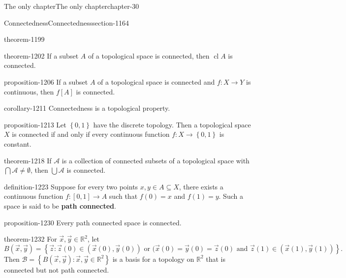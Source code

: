 \documentclass[oneside,10pt,]{book}
\newcommand{\terminology}[1]{\textbf{#1}}
\newcommand{\mb}{\mathbb}
\newcommand{\mc}{\mathcal}
\newcommand{\cl}{\operatorname{cl}}
\newcommand{\setBuilder}[2]{\left\{#1:#2\right\}}
\newcommand{\setList}[1]{\left\{#1\right\}}
\begin{document}
\begin{chapterptx}{The only chapter}{}{The only chapter}{}{}{chapter-30}
\begin{sectionptx}{Connectedness}{}{Connectedness}{}{}{section-1164}
\begin{theorem}{}{}{theorem-1199}
\end{theorem}
\begin{theorem}{}{}{theorem-1202}%
\hypertarget{p-1203}{}%
If a subset \(A\) of a topological space is connected, then \(\cl A\) is connected.%
\end{theorem}
\begin{proposition}{}{}{proposition-1206}%
\hypertarget{p-1207}{}%
If a subset \(A\) of a topological space is connected and \(f:X\to Y\) is continuous, then \(f[A]\) is connected.%
\end{proposition}
\begin{corollary}{}{}{corollary-1211}%
\hypertarget{p-1212}{}%
Connectedness is a topological property.%
\end{corollary}
\begin{proposition}{}{}{proposition-1213}%
\hypertarget{p-1214}{}%
Let \(\setList{0,1}\) have the discrete topology. Then a topological space \(X\) is connected if and only if every continuous function \(f:X\to\setList{0,1}\) is constant.%
\end{proposition}
\begin{theorem}{}{}{theorem-1218}%
\hypertarget{p-1219}{}%
If \(\mc A\) is a collection of connected subsets of a topological space with \(\bigcap\mc A\not=\emptyset\), then \(\bigcup\mc A\) is connected.%
\end{theorem}
\begin{definition}{}{definition-1223}%
\hypertarget{p-1224}{}%
Suppose for every two points \(x,y\in A\subseteq X\), there exists a continuous function \(f:[0,1]\to A\) such that \(f(0)=x\) and \(f(1)=y\). Such a space is said to be \terminology{path connected}.%
\end{definition}
\begin{proposition}{}{}{proposition-1230}%
\hypertarget{p-1231}{}%
Every path connected space is connected.%
\end{proposition}
\begin{theorem}{}{}{theorem-1232}%
\hypertarget{p-1233}{}%
For \(\vec x,\vec y\in\mb R^2\), let%
\begin{equation*}
B(\vec x,\vec y)=\setBuilder{\vec z}{\vec z(0)\in(\vec x(0),\vec y(0))
\text{ or } (\vec x(0)=\vec y(0)=\vec z(0) \text{ and }
\vec z(1)\in(\vec x(1),\vec y(1))}\text{.}
\end{equation*}
Then \(\mc B=\setBuilder{B(\vec x,\vec y)}{\vec x,\vec y\in\mb R^2}\) is a basis for a topology on \(\mb R^2\) that is connected but not path connected.%
\end{theorem}

\end{sectionptx}
\end{chapterptx}
\end{document}
